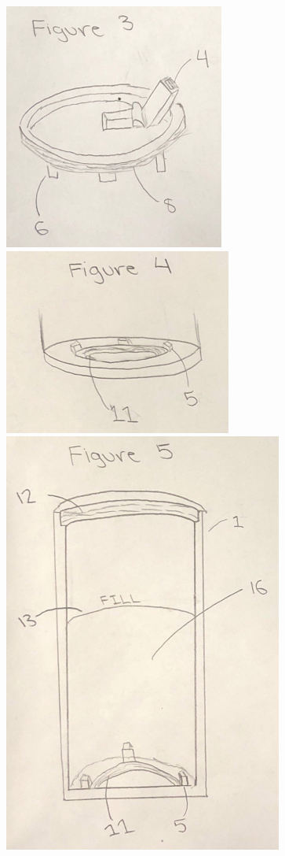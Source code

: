 \documentclass[english]{uspatent}
\begin{document}
\begin{center}
\includegraphics{Figure3.png}\\
\includegraphics{Figure4.png}\\
\includegraphics{Figure5.png}\\

\end{center}
\end{document}
